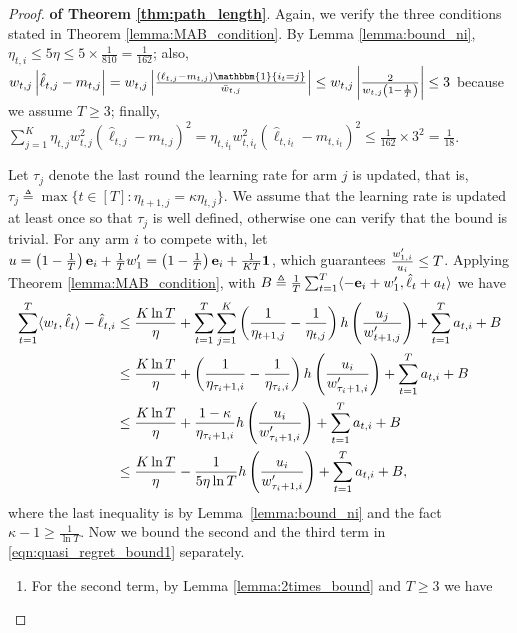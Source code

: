 \begin{proof}{\textbf{of Theorem \ref{thm:path_length}}.}
Again, we verify the three conditions stated in Theorem \ref{lemma:MAB_condition}. By Lemma \ref{lemma:bound_ni}, $\eta_{t,i}\leq 5\eta\leq 5\times\frac{1}{810}=\frac{1}{162}$; also, $w_{t,j}\absolute{\hat{\ell}_{t,j}-m_{t,j}}=w_{t,j}\absolute{\frac{(\ell_{t,j}-m_{t,j})\mathbbm{1}\{i_t=j\}}{\bar{w}_{t,j}}}\leq w_{t,j}\absolute{\frac{2}{w_{t,j}\left(1-\frac{1}{T}\right)}}\leq 3$ because we assume $T\geq 3$; finally, $
\sum_{j=1}^K \eta_{t,j}w_{t,j}^2(\hat{\ell}_{t,j}-m_{t,j})^2=\eta_{t,i_t}w_{t,i_t}^2(\hat{\ell}_{t,i_t}-m_{t,i_t})^2\leq \frac{1}{162}\times 3^2=\frac{1}{18}$.

Let $\tau_j$ denote the last round the learning rate for arm $j$ is updated, that is, $\tau_j\triangleq \max\{t\in [T]: \eta_{t+1,j}=\kappa\eta_{t,j} \}$. 
We assume that the learning rate is updated at least once so that $\tau_j$ is well defined, otherwise one can verify that the bound is trivial.
For any arm $i$ to compete with, let 
$u=\left(1-\frac{1}{T}\right)\mathbf{e}_{i}+\frac{1}{T}w_1^\prime
=\left(1-\frac{1}{T}\right)\mathbf{e}_{i}+\frac{1}{KT}\mathbf{1}$, which guarantees $\frac{w_{1,i}^\prime}{u_i}\leq T$. Applying Theorem \ref{lemma:MAB_condition}, with $B\triangleq \frac{1}{T}\sum_{t=1}^T \langle {-\mathbf{e}_{i}+w^\prime_{1}, \hat{\ell}_t+a_t} \rangle$ we have
\begin{align}
\sum_{t=1}^T\langle {w_t, \hat{\ell}_t} \rangle-\hat{\ell}_{t,i}&\leq \frac{K\ln T}{\eta} + \sum_{t=1}^{T}\sum_{j=1}^K\left(\frac{1}{\eta_{t+1,j}}-\frac{1}{\eta_{t,j}}\right)h\left(\frac{u_{j}}{w_{t+1,j}^\prime}\right)+\sum_{t=1}^T a_{t,i}+B\nonumber \\
&\leq \frac{K\ln T}{\eta} + \left(\frac{1}{\eta_{\tau_i+1,i}}-\frac{1}{\eta_{\tau_i,i}}\right)h\left(\frac{u_{i}}{w_{\tau_i+1,i}^\prime}\right)+\sum_{t=1}^T a_{t,i}+B\nonumber \\
&\leq \frac{K\ln T}{\eta} + \frac{1-\kappa}{\eta_{\tau_i+1,i}}h\left(\frac{u_{i}}{w_{\tau_i+1,i}^\prime}\right)+\sum_{t=1}^T a_{t,i}+B\nonumber \\
&\leq \frac{K\ln T}{\eta} - \frac{1}{5\eta \ln T}h\left(\frac{u_{i}}{w_{\tau_i+1,i}^\prime}\right)+\sum_{t=1}^T a_{t,i}+B,  \label{eqn:quasi_regret_bound1}
\end{align}
where the last inequality is by Lemma~\ref{lemma:bound_ni} and the fact $\kappa-1 \geq \frac{1}{\ln T}$. Now we bound the second and the third term in \eqref{eqn:quasi_regret_bound1} separately. 
\begin{enumerate}
\item For the second term,  by Lemma \ref{lemma:2times_bound} and $T \geq 3$ we have

\end{enumerate}
\end{proof}
